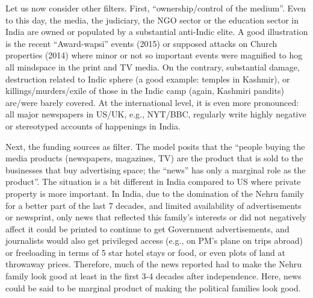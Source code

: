 Let us now consider other filters. First, “ownership/control of the medium”. Even to this day, the media, the judiciary, the NGO sector or the education sector in India are owned or populated by a substantial anti-Indic elite. A good illustration is the recent “Award-wapsi” events (2015) or supposed attacks on Church properties (2014) where minor or not so important events were magnified to hog all mindspace in the print and TV media.  On the contrary, substantial damage, destruction related to Indic sphere (a good example: temples in Kashmir), or killings/murders/exile of those in the Indic camp (again, Kashmiri pandits) are/were barely covered. At the international level, it is even more pronounced: all major newspapers in US/UK, e.g., NYT/BBC, regularly write highly negative or stereotyped accounts of happenings in India.

Next, the funding sources as filter. The model posits that the “people buying the media products (newspapers, magazines, TV) are the product that is sold to the businesses that buy advertising space; the “news” has only a marginal role as the product”. The situation is a bit different in India compared to US where private property is more important.  In India, due to the domination of the Nehru family for a better part of the last 7 decades, and limited availability of advertisements or newsprint, only news that reflected this family’s interests or did not negatively affect it could be printed to continue to get Government advertisements, and journalists would also get privileged access (e.g., on PM’s plane on trips abroad) or freeloading in terms of 5 star hotel stays or food, or even plots of land at throwaway prices. Therefore, much of the news reported had to make the Nehru family look good at least in the first 3-4 decades after independence. Here, news could be said to be marginal product of making the political families look good.

